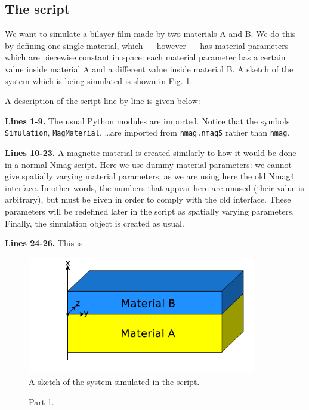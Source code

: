\documentclass[11pt,oneside,openany]{article}
\begin{document}
\subsection{The script}
We want to simulate a bilayer film made by two materials A and B.
We do this by defining one single material, which --- however --- has
material parameters which are piecewise constant in space: each material
parameter has a certain value inside material A and a different value
inside material B. A sketch of the system which is being simulated is
shown in Fig. \ref{fig:sketch}.

A description of the script line-by-line is given below:

\textbf{Lines 1-9.} The usual Python modules are imported.
Notice that the symbols \verb|Simulation|, \verb|MagMaterial|,
\ldots are imported from \verb|nmag.nmag5| rather than \verb|nmag|.

\textbf{Lines 10-23.} A magnetic material is created similarly to how
it would be done in a normal Nmag script. Here we use dummy material
parameters: we cannot give spatially varying material parameters, as
we are using here the old Nmag4 interface. In other words, the numbers
that appear here are unused (their value is arbitrary), but must be given
in order to comply with the old interface. These parameters will be
redefined later in the script as spatially varying parameters.
Finally, the simulation object is created as usual.

\textbf{Lines 24-26.} This is 

\begin{figure}[t]
\begin{center}
\includegraphics[width=10.0cm]{sketch}
\caption[Sketch]{A sketch of the system simulated in the script.}
\label{fig:sketch}
\end{center}
\end{figure}


\begin{figure}[!p]

\caption{Part 1.}
\end{figure}
\end{document}
